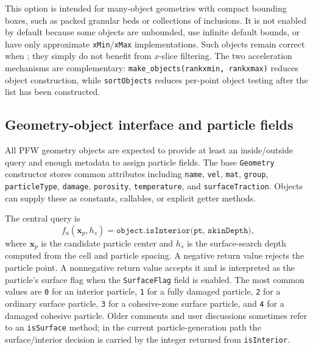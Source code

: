 This option is intended for many-object geometries with compact bounding boxes, such as packed granular beds or collections of inclusions.  It is not enabled by default because some objects are unbounded, use infinite default bounds, or have only approximate \texttt{xMin}/\texttt{xMax} implementations.  Such objects remain correct when ; they simply do not benefit from $x$-slice filtering.  The two acceleration mechanisms are complementary: \texttt{make\_objects(rankxmin, rankxmax)} reduces object construction, while \texttt{sortObjects} reduces per-point object testing after the list has been constructed.

\subsection{Geometry-object interface and particle fields}

All PFW geometry objects are expected to provide at least an inside/outside query and enough metadata to assign particle fields.  The base \texttt{Geometry} constructor stores common attributes including \texttt{name}, \texttt{vel}, \texttt{mat}, \texttt{group}, \texttt{particleType}, \texttt{damage}, \texttt{porosity}, \texttt{temperature}, and \texttt{surfaceTraction}.  Objects can supply these as constants, callables, or explicit getter methods.

The central query is
\begin{equation}
  f_a(\mathbf{x}_p,h_s)=\texttt{object.isInterior(pt, skinDepth)},
\end{equation}
where \(\mathbf{x}_p\) is the candidate particle center and \(h_s\) is the surface-search depth computed from the cell and particle spacing.  A negative return value rejects the particle point.  A nonnegative return value accepts it and is interpreted as the particle's surface flag when the \texttt{SurfaceFlag} field is enabled.  The most common values are \texttt{0} for an interior particle, \texttt{1} for a fully damaged particle, \texttt{2} for a ordinary surface particle, \texttt{3} for a cohesive-zone surface particle, and \texttt{4} for a damaged cohesive particle.  Older comments and user discussions sometimes refer to an \texttt{isSurface} method; in the current particle-generation path the surface/interior decision is carried by the integer returned from \texttt{isInterior}.

